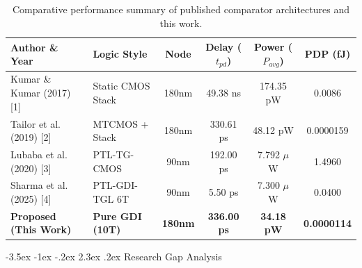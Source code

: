 \documentclass[12pt,a4paper,oneside]{report}
\makeatletter
\renewcommand\section{\@startsection {section}{1}{\z@}%
                                   {-3.5ex \@plus -1ex \@minus -.2ex}%
                                   {2.3ex \@plus.2ex}%
                                   {\normalfont\normalsize\bfseries}}
\makeatother
\begin{document}
\begin{table}[H]
\centering
\caption{Comparative performance summary of published comparator architectures and this work.}
\label{tab:lit_comparison_summary}
\vspace{0.2cm}
\begin{tabular}{|p{4.2cm}|p{2.8cm}|c|c|c|c|}
\hline
\textbf{Author \& Year} & \textbf{Logic Style} & \textbf{Node} & \textbf{Delay ($t_{pd}$)} & \textbf{Power ($P_{avg}$)} & \textbf{PDP (fJ)} \\
\hline
Kumar \& Kumar (2017) [1] & Static CMOS Stack & 180nm & 49.38 ns & 174.35 pW & 0.0086 \\
\hline
Tailor et al. (2019) [2] & MTCMOS + Stack & 180nm & 330.61 ps & 48.12 pW & 0.0000159 \\
\hline
Lubaba et al. (2020) [3] & PTL-TG-CMOS & 90nm & 192.00 ps & 7.792 $\mu$W & 1.4960 \\
\hline
Sharma et al. (2025) [4] & PTL-GDI-TGL 6T & 90nm & 5.50 ps & 7.300 $\mu$W & 0.0400 \\
\hline
\textbf{Proposed (This Work)} & \textbf{Pure GDI (10T)} & \textbf{180nm} & \textbf{336.00 ps} & \textbf{34.18 pW} & \textbf{0.0000114} \\
\hline
\end{tabular}
\end{table}

\section{Research Gap Analysis}
\end{document}
